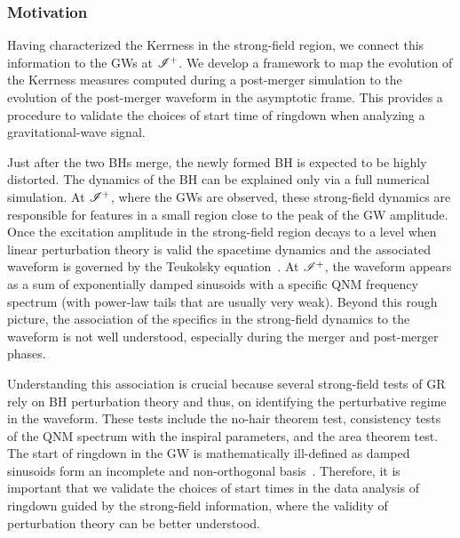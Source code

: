 \subsubsection{Motivation}
\label{sec:AFQMotivation}

\cartoon

Having characterized the Kerrness in the strong-field region, we connect this information to the GWs at $\mathscr{I^+}$. We develop a framework to map the evolution of the Kerrness measures computed during a post-merger simulation to the evolution of the post-merger waveform in the asymptotic frame. This provides a procedure to validate the choices of start time of ringdown when analyzing a gravitational-wave signal. 

Just after the two BHs merge, the newly formed BH is expected to be highly distorted. The dynamics of the BH can be explained only via a full numerical simulation. At $\mathscr{I^+}$, where the GWs are observed, these strong-field dynamics are responsible for features in a small region close to the peak of the GW amplitude. Once the excitation amplitude in the strong-field region decays to a level when linear perturbation theory is valid 
the spacetime dynamics and the associated waveform is governed by the Teukolsky equation~\cite{Teukolsky1,Teukolsky2,Teukolsky3}. At $\mathscr{I^+}$, the waveform appears as a sum of exponentially damped sinusoids with a specific QNM frequency spectrum (with power-law tails that are usually very weak). Beyond this rough picture, the association of the specifics in the strong-field dynamics to the waveform is not well understood, especially during the merger and post-merger phases. 

Understanding this association is crucial because several strong-field tests of GR rely on BH perturbation theory and thus, on identifying the perturbative regime in the waveform. These tests include the no-hair theorem test, consistency tests of the QNM spectrum with the inspiral parameters, and the area theorem test. The start of ringdown in the GW is mathematically ill-defined as damped sinusoids form an incomplete and non-orthogonal basis~\cite{QNMincomplete,QNMnonorthogonal}. Therefore, it is important that we validate the choices of start times in the data analysis of ringdown guided by the strong-field information, where the validity of perturbation theory can be better understood.


